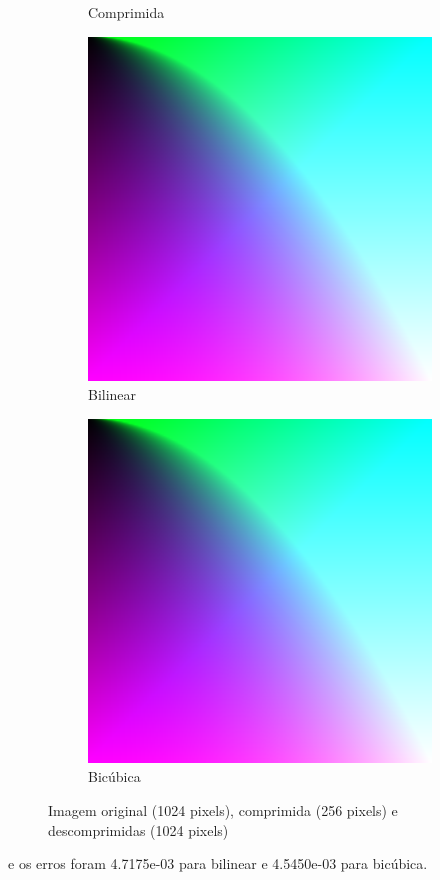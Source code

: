 \documentclass{article}
\begin{document}
\begin{figure}[ht]
\begin{subfigure}{0.23\textwidth}
    \caption{Comprimida}
  \end{subfigure}%
  \hfill
  \begin{subfigure}{0.23\textwidth}
    \centering
    \includegraphics[width=\textwidth]{notc1/decompressed-bilinear.png}
    \caption{Bilinear}
  \end{subfigure}%
  \hfill
  \begin{subfigure}{0.23\textwidth}
    \centering
    \includegraphics[width=\textwidth]{notc1/decompressed-bicubica.png}
    \caption{Bicúbica}
  \end{subfigure}
  \caption{Imagem original (1024 pixels), comprimida (256 pixels) e descomprimidas (1024 pixels)}
\end{figure}
e os erros foram 4.7175e-03 para bilinear e 4.5450e-03 para bicúbica.
\end{document}
